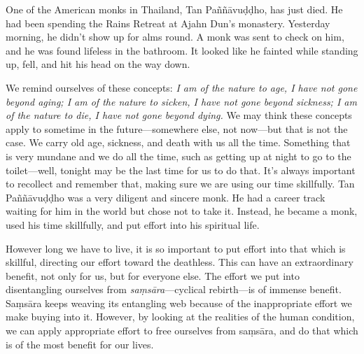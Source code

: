 
One of the American monks in Thailand, Tan Paññāvuḍḍho, has just 
died. He had been spending the Rains Retreat at Ajahn Dun's monastery. 
Yesterday morning, he didn't show up for alms round. A monk was sent to 
check on him, and he was found lifeless in the bathroom. It looked like 
he fainted while standing up, fell, and hit his head on the way down.

We remind ourselves of these concepts: \emph{I am of the nature to age, 
I have not gone beyond aging; I am of the nature to sicken, I have not 
gone beyond sickness; I am of the nature to die, I have not gone beyond 
dying.} We may think these concepts apply to sometime in the 
future---somewhere else, not now---but that is not the case. We carry 
old age, sickness, and death with us all the time. Something that is 
very mundane and we do all the time, such as getting up at night to go 
to the toilet---well, tonight may be the last time for us to do that. 
It's always important to recollect and remember that, making sure we 
are using our time skillfully. Tan Paññāvuḍḍho was a very 
diligent and sincere monk. He had a career track waiting for him in the 
world but chose not to take it. Instead, he became a monk, used his 
time skillfully, and put effort into his spiritual life.

However long we have to live, it is so important to put effort into 
that which is skillful, directing our effort toward the deathless. This 
can have an extraordinary benefit, not only for us, but for everyone 
else. The effort we put into disentangling ourselves from 
\emph{saṃsāra}---cyclical rebirth---is of immense benefit. 
Saṃsāra keeps weaving its entangling web because of the 
inappropriate effort we make buying into it. However, by looking at the 
realities of the human condition, we can apply appropriate effort to 
free ourselves from saṃsāra, and do that which is of the most 
benefit for our lives.


